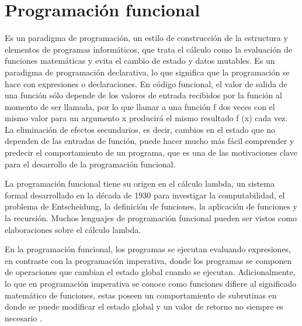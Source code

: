 
\section{Programación funcional}  %

\ifpdf
    \graphicspath{{progFun/Figs/Raster/}{progFun/Figs/PDF/}{progFun/Figs/}}
\else
    \graphicspath{{progFun/Figs/Vector/}{progFun/Figs/}}
\fi


Es un paradigma de programación, un estilo de construcción de la estructura y elementos de programas informáticos, que trata el cálculo como la evaluación de funciones matemáticas y evita el cambio de estado y datos mutables. Es un paradigma de programación declarativa, lo que significa que la programación se hace con expresiones o declaraciones. En código funcional, el valor de salida de una función sólo depende de los valores de entrada recibidos por la función al momento de ser llamada, por lo que llamar a una función f dos veces con el mismo valor para un argumento x producirá el mismo resultado f (x) cada vez. La eliminación de efectos secundarios, es decir, cambios en el estado que no dependen de las entradas de función, puede hacer mucho más fácil comprender y predecir el comportamiento de un programa, que es una de las motivaciones clave para el desarrollo de la programación funcional.

La programación funcional tiene su origen en el cálculo lambda, un sistema formal desarrollado en la década de 1930 para investigar la computabilidad, el problema de Entscheidung, la definición de funciones, la aplicación de funciones y la recursión. Muchos lenguajes de programación funcional pueden ser vistos como elaboraciones sobre el cálculo lambda.

En la programación funcional, los programas se ejecutan evaluando expresiones, en contraste con la programación imperativa, donde los programas se componen de operaciones que cambian el estado global cuando se ejecutan. Adicionalmente, lo que en programación imperativa se conoce como funciones difiere al significado matemático de funciones, estas poseen un comportamiento de subrutinas en donde se puede modificar el estado global y un valor de retorno no siempre es necesario \cite{wiki:FunctionalProgramming}.


